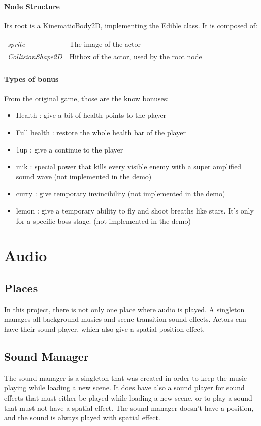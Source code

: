 \documentclass[10pt,a4paper]{article}
\begin{document}
\paragraph{Node Structure}
Its root is a KinematicBody2D, implementing the Edible class.
It is composed of: \\
\begin{tabular}{ l  l }
  \textit{sprite} & The image of the actor \\
  \textit{CollisionShape2D} & Hitbox of the actor, used by the root node \\
\end{tabular}

\paragraph{Types of bonus}
From the original game, those are the know bonuses:
\begin{itemize}
\item Health : give a bit of health points to the player
\item Full health : restore the whole health bar of the player
\item 1up : give a continue to the player
\item mik : special power that kills every visible enemy with a super amplified sound wave (not implemented in the demo)
\item curry : give temporary invincibility (not implemented in the demo)
\item lemon : give a temporary ability to fly and shoot breaths like stars. It's only for a specific boss stage. (not implemented in the demo)
\end{itemize}

\section{Audio}

\subsection{Places}
In this project, there is not only one place where audio is played.
A singleton manages all background musics and scene transition sound effects. Actors can have their sound player, which also give a spatial position effect.
\subsection{Sound Manager}
The sound manager is a singleton that was created in order to keep the music playing while loading a new scene. It does have also a sound player for sound effects that must either be played while loading a new scene, or to play a sound that must not have a spatial effect. The sound manager doesn't have a position, and the sound is always played with spatial effect.
\end{document}
